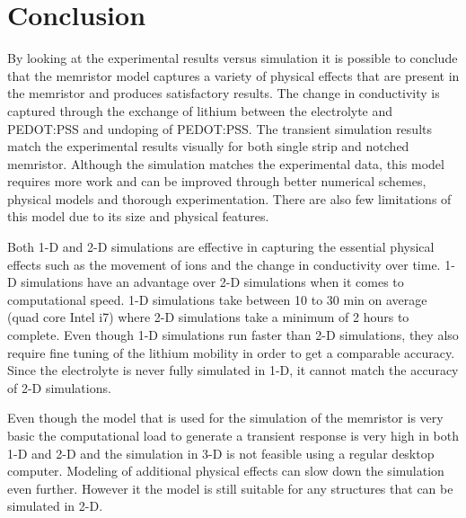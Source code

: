 
\chapter{Conclusion} %

\label{Chapter7} %


\begin{doublespace}


By looking at the experimental results versus simulation it is possible to conclude that the memristor model captures a variety of physical effects that are present in the memristor and produces satisfactory results. The change in conductivity is captured through the exchange of lithium between the electrolyte and PEDOT:PSS and undoping of PEDOT:PSS. The transient simulation results match the experimental results visually for both single strip and notched memristor. Although the simulation matches the experimental data, this model requires more work and can be improved through better numerical schemes, physical models and thorough experimentation. There are also few limitations of this model due to its size and physical features.

Both 1-D and 2-D simulations are effective in capturing the essential physical effects such as the movement of ions and the change in conductivity over time. 1-D simulations have an advantage over 2-D simulations when it comes to computational speed. 1-D simulations take between 10 to 30 min on average (quad core Intel i7) where 2-D simulations take a minimum of 2 hours to complete. Even though 1-D simulations run faster than 2-D simulations, they also require fine tuning of the lithium mobility in order to get a comparable accuracy. Since the electrolyte is never fully simulated in 1-D, it cannot match the accuracy of 2-D simulations.

Even though the model that is used for the simulation of the memristor is very basic the computational load to generate a transient response is very high in both 1-D and 2-D and the simulation in 3-D is not feasible using a regular desktop computer.  Modeling of additional physical effects can slow down the simulation even further. However it the model is still suitable for any structures that can be simulated in 2-D.  


\end{doublespace}
